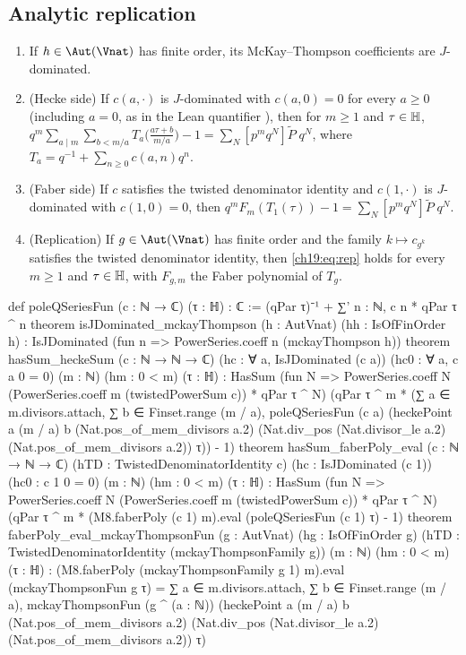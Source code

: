 \subsection{Analytic replication}

\begin{theorem}\label{ch19:thm:repanalytic}
\begin{enumerate}[label=(\alph*)]
\item If $h\in\Aut(\Vnat)$ has finite order, its McKay--Thompson coefficients are $J$-dominated.
\item (Hecke side) If $c(a,\cdot)$ is $J$-dominated with $c(a,0)=0$ for every $a\ge0$ (including $a=0$, as in the Lean
  quantifier ), then for $m\ge1$ and $\tau\in\mathbb{H}$,
  $q^m\sum_{a\mid m}\sum_{b<m/a}T_a\bigl(\frac{a\tau+b}{m/a}\bigr)-1=\sum_N[p^mq^N]\tilde P\;q^N$, where
  $T_a=q^{-1}+\sum_{n\ge0}c(a,n)q^n$.
\item (Faber side) If $c$ satisfies the twisted denominator identity and $c(1,\cdot)$ is $J$-dominated with $c(1,0)=0$,
  then $q^mF_m(T_1(\tau))-1=\sum_N[p^mq^N]\tilde P\;q^N$.
\item (Replication) If $g\in\Aut(\Vnat)$ has finite order and the family $k\mapsto c_{g^k}$ satisfies the twisted denominator
  identity, then \eqref{ch19:eq:rep} holds for every $m\ge1$ and $\tau\in\mathbb{H}$, with $F_{g,m}$ the Faber polynomial of
  $T_g$.
\end{enumerate}
\end{theorem}
\begin{leancode}
def poleQSeriesFun (c : ℕ → ℂ) (τ : ℍ) : ℂ :=
  (qPar τ)⁻¹ + ∑' n : ℕ, c n * qPar τ ^ n
theorem isJDominated_mckayThompson (h : AutVnat) (hh : IsOfFinOrder h) :
    IsJDominated (fun n => PowerSeries.coeff n (mckayThompson h))
theorem hasSum_heckeSum (c : ℕ → ℕ → ℂ) (hc : ∀ a, IsJDominated (c a)) (hc0 : ∀ a, c a 0 = 0)
    (m : ℕ) (hm : 0 < m) (τ : ℍ) :
    HasSum (fun N => PowerSeries.coeff N (PowerSeries.coeff m (twistedPowerSum c)) * qPar τ ^ N)
      (qPar τ ^ m * (∑ a ∈ m.divisors.attach, ∑ b ∈ Finset.range (m / a),
        poleQSeriesFun (c a) (heckePoint a (m / a) b (Nat.pos_of_mem_divisors a.2)
          (Nat.div_pos (Nat.divisor_le a.2) (Nat.pos_of_mem_divisors a.2)) τ)) - 1)
theorem hasSum_faberPoly_eval (c : ℕ → ℕ → ℂ) (hTD : TwistedDenominatorIdentity c)
    (hc : IsJDominated (c 1)) (hc0 : c 1 0 = 0) (m : ℕ) (hm : 0 < m) (τ : ℍ) :
    HasSum (fun N => PowerSeries.coeff N (PowerSeries.coeff m (twistedPowerSum c)) * qPar τ ^ N)
      (qPar τ ^ m * (M8.faberPoly (c 1) m).eval (poleQSeriesFun (c 1) τ) - 1)
theorem faberPoly_eval_mckayThompsonFun (g : AutVnat) (hg : IsOfFinOrder g)
    (hTD : TwistedDenominatorIdentity (mckayThompsonFamily g)) (m : ℕ) (hm : 0 < m) (τ : ℍ) :
    (M8.faberPoly (mckayThompsonFamily g 1) m).eval (mckayThompsonFun g τ) =
      ∑ a ∈ m.divisors.attach, ∑ b ∈ Finset.range (m / a),
        mckayThompsonFun (g ^ (a : ℕ)) (heckePoint a (m / a) b (Nat.pos_of_mem_divisors a.2)
          (Nat.div_pos (Nat.divisor_le a.2) (Nat.pos_of_mem_divisors a.2)) τ)
\end{leancode}
